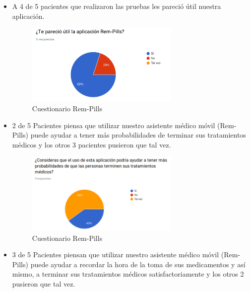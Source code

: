 \begin{itemize}
	\item A 4 de 5 pacientes que realizaron las pruebas les pareció útil nuestra aplicación.

	\begin{figure}[htb]
		\centering
		\includegraphics[width=0.7\textwidth]{images/Pruebas/Pac1}
		\caption{Cuestionario Rem-Pills} 
		\label{fig:Pac1}
	\end{figure} 
\newpage
	\item 2 de 5 Pacientes piensa que utilizar nuestro asistente médico móvil (Rem-Pills) puede ayudar a tener más probabilidades de terminar sus tratamientos médicos y los otros 3 pacientes pusieron que tal vez.
	\begin{figure}[htb]
		\centering
		\includegraphics[width=0.7\textwidth]{images/Pruebas/Pac2}
		\caption{Cuestionario Rem-Pills} 
		\label{fig:Pac2}
	\end{figure} 

	
	\item 3 de 5 Pacientes piensan que utilizar nuestro asistente médico móvil (Rem-Pills) puede ayudar a recordar la hora de la toma de sus medicamentos y así mismo, a terminar sus tratamientos médicos satisfactoriamente y los otros 2 pusieron que tal vez.


\end{itemize}
